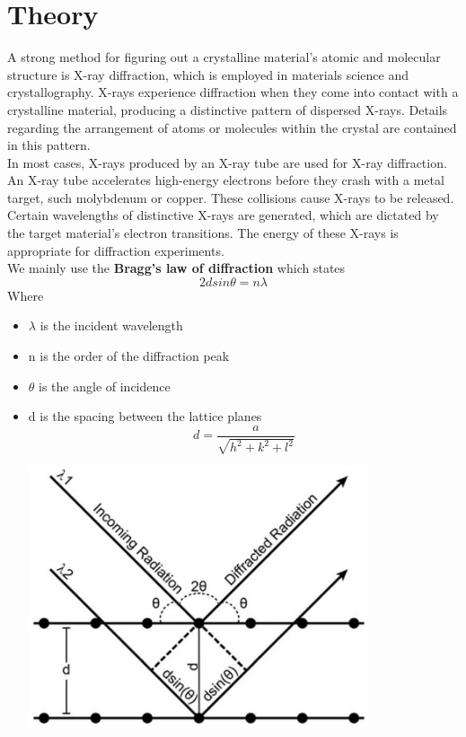 \documentclass[]{report}[12 pt]
\begin{document}
	\section*{Theory}
A strong method for figuring out a crystalline material's atomic and molecular structure is X-ray diffraction, which is employed in materials science and crystallography. X-rays experience diffraction when they come into contact with a crystalline material, producing a distinctive pattern of dispersed X-rays. Details regarding the arrangement of atoms or molecules within the crystal are contained in this pattern.\\
In most cases, X-rays produced by an X-ray tube are used for X-ray diffraction. An X-ray tube accelerates high-energy electrons before they crash with a metal target, such molybdenum or copper. These collisions cause X-rays to be released.\\
Certain wavelengths of distinctive X-rays are generated, which are dictated by the target material's electron transitions. The energy of these X-rays is appropriate for diffraction experiments.\\
We mainly use the \textbf{Bragg's law of diffraction} which states
\[2dsin\theta = n\lambda\]
Where\\
\begin{itemize}
	\item $\lambda$ is the incident wavelength
	\item n is the order of the diffraction peak
	\item $\theta$ is the angle of incidence
	\item d is the spacing between the lattice planes
	\[d=\frac{a}{\sqrt{h^2+k^2+l^2}}\]
	\begin{center}
		\includegraphics[width=10cm]{bragg.jpg}
	\end{center}
\end{itemize}
\end{document}
